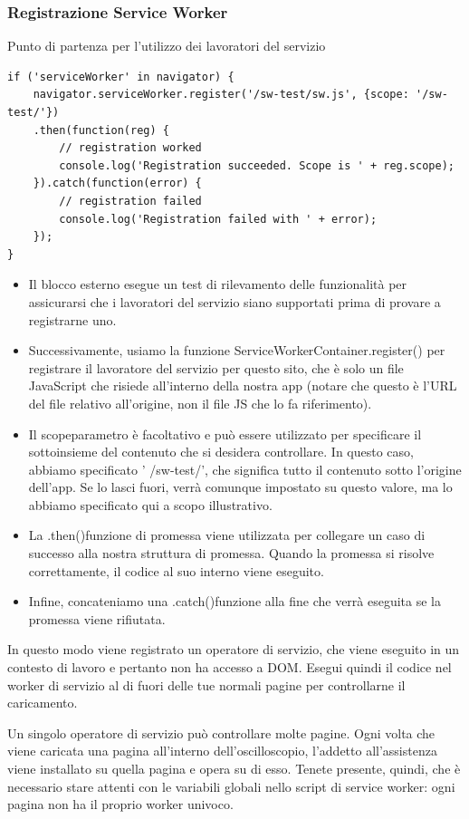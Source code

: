 \documentclass[italian]{article}
\begin{document}
\subsubsection{Registrazione Service Worker}
Punto di partenza per l'utilizzo dei lavoratori del servizio
\begin{lstlisting}
if ('serviceWorker' in navigator) {
	navigator.serviceWorker.register('/sw-test/sw.js', {scope: '/sw-test/'})
	.then(function(reg) {
		// registration worked
		console.log('Registration succeeded. Scope is ' + reg.scope);
	}).catch(function(error) {
		// registration failed
		console.log('Registration failed with ' + error);
	});
}
\end{lstlisting}
\begin{itemize}
\item Il blocco esterno esegue un test di rilevamento delle funzionalità per assicurarsi che i lavoratori del servizio siano supportati prima di provare a registrarne uno.
\item Successivamente, usiamo la funzione ServiceWorkerContainer.register() per registrare il lavoratore del servizio per questo sito, che è solo un file JavaScript che risiede all'interno della nostra app (notare che questo è l'URL del file relativo all'origine, non il file JS che lo fa riferimento).
\item Il scopeparametro è facoltativo e può essere utilizzato per specificare il sottoinsieme del contenuto che si desidera controllare. In questo caso, abbiamo specificato ' /sw-test/', che significa tutto il contenuto sotto l'origine dell'app. Se lo lasci fuori, verrà comunque impostato su questo valore, ma lo abbiamo specificato qui a scopo illustrativo.
\item La .then()funzione di promessa viene utilizzata per collegare un caso di successo alla nostra struttura di promessa. Quando la promessa si risolve correttamente, il codice al suo interno viene eseguito.
\item Infine, concateniamo una .catch()funzione alla fine che verrà eseguita se la promessa viene rifiutata.
\end{itemize}
In questo modo viene registrato un operatore di servizio, che viene eseguito in un contesto di lavoro e pertanto non ha accesso a DOM. Esegui quindi il codice nel worker di servizio al di fuori delle tue normali pagine per controllarne il caricamento. 

Un singolo operatore di servizio può controllare molte pagine. Ogni volta che viene caricata una pagina all'interno dell'oscilloscopio, l'addetto all'assistenza viene installato su quella pagina e opera su di esso. Tenete presente, quindi, che è necessario stare attenti con le variabili globali nello script di service worker: ogni pagina non ha il proprio worker univoco.
\end{document}
